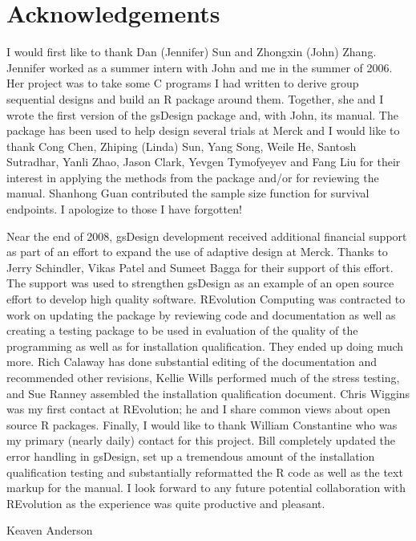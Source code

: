 \section{Acknowledgements}

I would first like to thank Dan (Jennifer) Sun and Zhongxin (John) Zhang. Jennifer worked as a summer intern with John and me in the summer of 2006. Her project was to take some C programs I had written to derive group sequential designs and build an R package around them. Together, she and I wrote the first version of the gsDesign package and, with John, its manual. The package has been used to help design several trials at Merck and I would like to thank Cong Chen, Zhiping (Linda) Sun, Yang Song, Weile He, Santosh Sutradhar, Yanli Zhao, Jason Clark, Yevgen Tymofyeyev and Fang Liu for their interest in applying the methods from the package and/or for reviewing the manual. Shanhong Guan contributed the sample size function for survival endpoints. I apologize to those I have forgotten!

Near the end of 2008, gsDesign development received additional financial support as part of an effort to expand the use of adaptive design at Merck. Thanks to Jerry Schindler, Vikas Patel and Sumeet Bagga for their support of this effort. The support was used to strengthen gsDesign as an example of an open source effort to develop high quality software. REvolution Computing was contracted to work on updating the package by reviewing code and documentation as well as creating a testing package to be used in evaluation of the quality of the programming as well as for installation qualification. They ended up doing much more. Rich Calaway has done substantial editing of the documentation and recommended other revisions, Kellie Wills performed much of the stress testing, and Sue Ranney assembled the installation qualification document. Chris Wiggins was my first contact at REvolution; he and I share common views about open source R packages. Finally, I would like to thank William Constantine who was my primary (nearly daily) contact for this project. Bill completely updated the error handling in gsDesign, set up a tremendous amount of the installation qualification testing and substantially reformatted the R code as well as the text markup for the manual. I look forward to any future potential collaboration with REvolution as the experience was quite productive and pleasant.

Keaven Anderson
